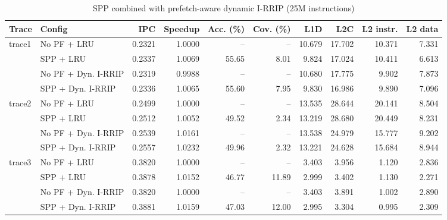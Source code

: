 \begin{table}[t]
\centering
\caption{SPP combined with prefetch-aware dynamic I-RRIP (25M instructions)}
\label{tab:task3}
\footnotesize
\setlength{\tabcolsep}{3pt}
\begin{adjustbox}{max width=\linewidth}
\begin{tabular}{llrrrrrrrr}
\toprule
Trace & Config & IPC & Speedup & Acc. (\%) & Cov. (\%) & L1D & L2C & L2 instr. & L2 data \\
\midrule
trace1 & No PF + LRU & 0.2321 & 1.0000 & -- & -- & 10.679 & 17.702 & 10.371 & 7.331 \\
 & SPP + LRU & 0.2337 & 1.0069 & 55.65 & 8.01 & 9.824 & 17.024 & 10.411 & 6.613 \\
 & No PF + Dyn. I-RRIP & 0.2319 & 0.9988 & -- & -- & 10.680 & 17.775 & 9.902 & 7.873 \\
 & SPP + Dyn. I-RRIP & 0.2336 & 1.0065 & 55.60 & 7.95 & 9.830 & 16.986 & 9.890 & 7.096 \\
\midrule
trace2 & No PF + LRU & 0.2499 & 1.0000 & -- & -- & 13.535 & 28.644 & 20.141 & 8.504 \\
 & SPP + LRU & 0.2512 & 1.0052 & 49.52 & 2.34 & 13.219 & 28.680 & 20.449 & 8.231 \\
 & No PF + Dyn. I-RRIP & 0.2539 & 1.0161 & -- & -- & 13.538 & 24.979 & 15.777 & 9.202 \\
 & SPP + Dyn. I-RRIP & 0.2557 & 1.0232 & 49.96 & 2.32 & 13.221 & 24.628 & 15.684 & 8.944 \\
\midrule
trace3 & No PF + LRU & 0.3820 & 1.0000 & -- & -- & 3.403 & 3.956 & 1.120 & 2.836 \\
 & SPP + LRU & 0.3878 & 1.0152 & 46.77 & 11.89 & 2.999 & 3.402 & 1.130 & 2.271 \\
 & No PF + Dyn. I-RRIP & 0.3820 & 1.0000 & -- & -- & 3.403 & 3.891 & 1.002 & 2.890 \\
 & SPP + Dyn. I-RRIP & 0.3881 & 1.0159 & 47.03 & 12.00 & 2.995 & 3.304 & 0.995 & 2.309 \\
\bottomrule
\end{tabular}
\end{adjustbox}
\end{table}
